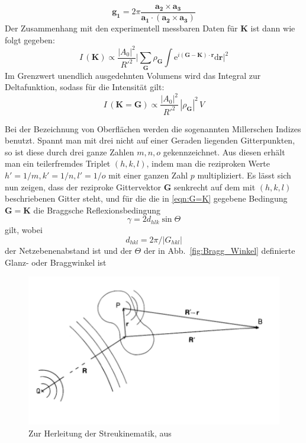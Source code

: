 \begin{equation}
    \mathbf{g_1} = 2 \pi \frac{\mathbf{a_2 \times a_3} }
        {\mathbf{a_1\cdot (a_2 \times a_3)}}
\end{equation}
Der Zusammenhang mit den experimentell messbaren Daten für $\mathbf{K}$ ist dann wie 
folgt gegeben:
\begin{equation} \label{eqn:G=K}
    I\,(\mathbf{K}) \propto \frac{|A_0|^2}{R'^2} \Big| \sum_{\mathbf{G}} \rho_{\mathbf{G}} 
    \int \mathrm{e}^{i \mathbf{(G - K) \cdot r}} \mathrm{d} \mathbf{r} \Big|^2
\end{equation}
Im Grenzwert unendlich ausgedehnten Volumens wird das Integral zur Deltafunktion, sodass 
für die Intensität gilt:
\begin{equation}
    I\,(\mathbf{K = G}) \propto \frac{|A_0|^2}{R'^2} \,|\rho_{\mathbf{G}} |^2 \, V
\end{equation}

Bei der Bezeichnung von Oberflächen werden die sogenannten Millerschen Indizes benutzt. 
Spannt man mit drei nicht auf einer Geraden liegenden Gitterpunkten, so ist diese durch 
drei ganze Zahlen $m, n, o$ gekennzeichnet. Aus diesen erhält man ein teilerfremdes 
Triplet $(h, k, l)$, indem man die reziproken Werte $h' = 1/m, k' = 1/n, l' = 1/o$ mit 
einer ganzen Zahl $p$ multipliziert. Es lässt sich nun zeigen, dass der reziproke 
Gittervektor $\mathbf{G}$ senkrecht auf dem mit $(h, k, l)$ beschriebenen Gitter steht, 
und für die die in \ref{eqn:G=K} gegebene Bedingung $\mathbf{G = K}$ die Braggsche Reflexionsbedingung 
\begin{equation}
    \gamma = 2 d_{hlk} \sin \Theta
\end{equation}
gilt, wobei 
\begin{equation}
    d_{hkl}=2 \pi / |G_{hkl}|
\end{equation}
der Netzebenenabstand ist und der $\Theta$ der in Abb.~\ref{fig:Bragg_Winkel} definierte
Glanz- oder Braggwinkel ist

\begin{figure}
    \includegraphics[width=1.0\textwidth]{pics/scatter_geometry}
    \caption{Zur Herleitung der Streukinematik,
aus \cite{ibach2009festkorperphysik} }
    \label{fig:scatter_geometry}
\end{figure}

